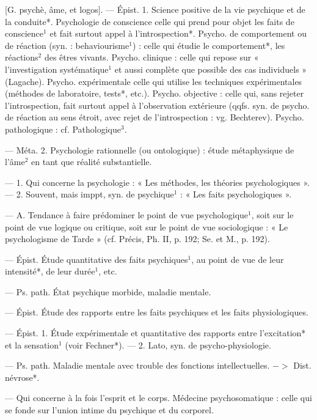 \begin{itemize}[leftmargin=1cm, label=, itemsep=1pt]
 [G. psychè, âme, et logos].
— Épist. 1. Science positive de la vie
psychique et de la conduite*. Psychologie de conscience celle qui
prend pour objet les faits de conscience$^1$ et fait surtout appel à l’introspection*. Psycho. de comportement ou de réaction (syn. : behaviourisme$^1$) : celle qui étudie le comportement*,
les réactions$^2$ des êtres
vivants. Psycho. clinique : celle qui
repose sur « l'investigation systématique$^1$ et aussi complète que possible des cas individuels » (Lagache).
Psycho. expérimentale celle qui
utilise les techniques expérimentales (méthodes de laboratoire,
tests*, etc.). Psycho. objective : celle
qui, sans rejeter l’introspection, fait
surtout appel à l'observation extérieure (qqfs. syn. de psycho. de réaction au sens étroit, avec rejet de l’introspection : vg. Bechterev). Psycho.
pathologique : cf. Pathologique$^3$.

— Méta. 2. Psychologie rationnelle (ou ontologique) : étude métaphysique de l'âme$^2$ en tant que
réalité substantielle.

 — 1. Qui concerne la
psychologie : « Les méthodes, les
théories psychologiques ». — 2. Souvent, mais imppt, syn. de psychique$^1$ :
« Les faits psychologiques ».

 — A. Tendance à faire
prédominer le point de vue psychologique$^1$, soit sur le point de vue
logique ou critique, soit sur le point
de vue sociologique : « Le psychologisme de Tarde » (cf. Précis, Ph. II,
p. 192; Se. et M., p. 192).

 — Épist. Étude quantitative des faits psychiques$^1$, au
point de vue de leur intensité*, de
leur durée$^1$, etc.

 — Ps. path. État psychique morbide, maladie mentale.

 — Épist. Étude
des rapports entre les faits psychiques et les faits physiologiques.

 — Épist. 1. Étude
expérimentale et quantitative des
rapports entre l’excitation* et la
sensation$^1$ (voir Fechner*). — 2.
Lato, syn. de psycho-physiologie.

 — Ps. path. Maladie mentale
avec trouble des fonctions intellectuelles. $->$ Dist. névrose*.

 — Qui concerne à la
fois l'esprit et le corps. Médecine
psychosomatique : celle qui se fonde
sur l’union intime du psychique et
du corporel.


\end{itemize}
